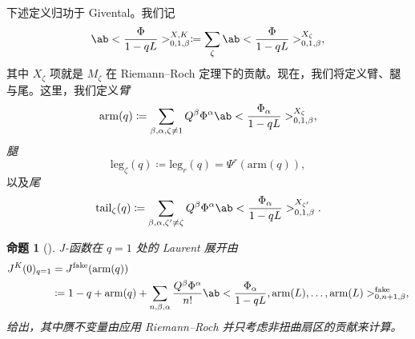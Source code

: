 \documentclass{amsart}
\newtheorem{prop}[thm]{命题}
\theoremstyle{definition}
\theoremstyle{remark}
\theoremstyle{plain}
\theoremstyle{definition}
\theoremstyle{remark}
\newcommand{\mr}[1]{\mathrm{#1}}
\newcommand{\1}{\mathbf{1}}
\newcommand{\2}{\mathbf{2}}
\newcommand{\3}{\mathbf{3}}
\begin{document}
%
%

下述定义归功于 Givental。我们记
\[ \ab<\frac{\Phi}{1-qL}>_{0,1,\beta}^{X,K} \coloneqq \sum_{\zeta} \ab<\frac{\Phi}{1-qL}>_{0,1,\beta}^{X_{\zeta}}, \]
其中 \(X_{\zeta}\) 项就是 \(M_{\zeta}\) 在 Riemann–Roch 定理下的贡献。现在，我们将定义臂、腿与尾。这里，我们定义\textit{臂}
\[ \mr{arm}(q) \coloneqq \sum_{\beta, \alpha, \zeta \neq 1} Q^{\beta} \Phi^{\alpha}\ab<\frac{\Phi_{\alpha}}{1-qL}>_{0,1,\beta}^{X_{\zeta}}, \]
\textit{腿}
\[ \mr{leg}_{\zeta}(q) \coloneqq \mr{leg}_r(q) = \Psi^r (\mr{arm}(q)), \]
以及\textit{尾}
\[ \mr{tail}_{\zeta}(q) \coloneqq \sum_{\beta, \alpha, \zeta' \neq \zeta} Q^{\beta} \Phi^{\alpha} \ab<\frac{\Phi_{\alpha}}{1-qL}>_{0,1,\beta}^{X_{\zeta'}}. \]

\begin{prop}[{\cite{GiventalTonita2014}}]
    J-函数在 \(q = 1\) 处的 Laurent 展开由
    \begin{align*}
        J^K(0)_{q=1} &= J^{\mr{fake}}(\mr{arm}(q)) \\
        &\coloneqq 1-q + \mr{arm}(q) + \sum_{n,\beta,\alpha} \frac{Q^{\beta}\Phi^{\alpha}}{n!} \ab<\frac{\Phi_{\alpha}}{1-qL}, \mr{arm}(L), \ldots, \mr{arm}(L)>_{0,n+1,\beta}^{\mr{fake}},
    \end{align*}
    给出，其中赝不变量由应用 Riemann–Roch 并只考虑非扭曲扇区的贡献来计算。
\end{prop}
\end{document}

